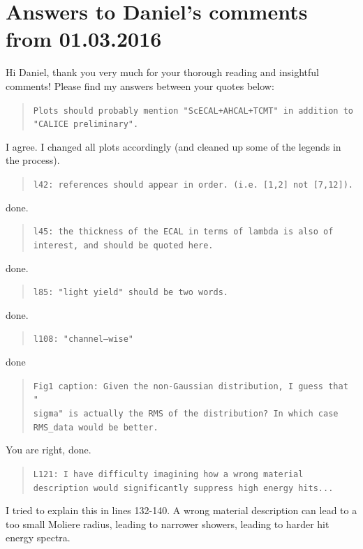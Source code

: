 \documentclass[twoside,a4paper,12pt]{article}
\begin{document}




\section*{Answers to Daniel's comments from 01.03.2016}
Hi Daniel,
thank you very much for your thorough reading and insightful comments!
Please find my answers between your quotes below:

\begin{quote}\texttt{Plots should probably mention "ScECAL+AHCAL+TCMT" in addition to "CALICE preliminary".}\end{quote}
I agree. I changed all plots accordingly (and cleaned up some of the legends in the process). 

\begin{quote}\texttt{l42: references should appear in order. (i.e. [1,2] not [7,12]).}\end{quote}
done.

\begin{quote}\texttt{l45: the thickness of the ECAL in terms of lambda is also of interest, and should be quoted here.}\end{quote}
done.

\begin{quote}\texttt{l85: "light yield" should be two words.}\end{quote}
done.

\begin{quote}\texttt{l108: "channel--wise"}\end{quote}
done

\begin{quote}\texttt{Fig1 caption: Given the non-Gaussian distribution, I guess that "\\sigma" is actually the RMS of the distribution? 
In which case RMS\_{data} would be better.}\end{quote}
You are right, done.

\begin{quote}\texttt{L121: I have difficulty imagining how a wrong material description would significantly suppress high energy hits...}\end{quote}
I tried to explain this in lines 132-140. A wrong material description can lead to a too small Moliere radius, leading to narrower showers, leading to harder hit energy spectra. 
\end{document}
